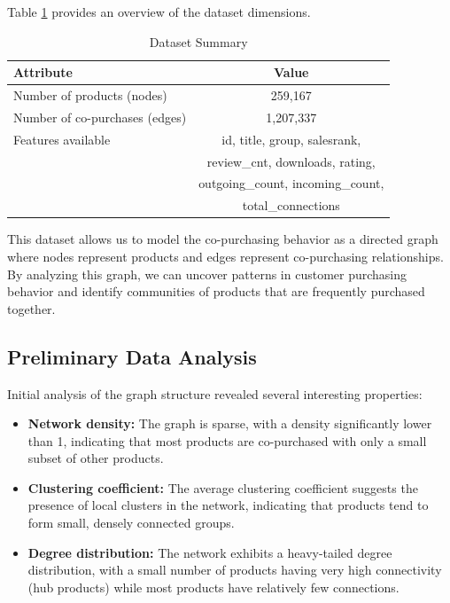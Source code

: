 \documentclass[conference]{IEEEtran}
\begin{document}
Table \ref{tab:data-summary} provides an overview of the dataset dimensions.

\begin{table}[ht]
\centering
\caption{Dataset Summary}
\label{tab:data-summary}
\begin{tabular}{lc}
\toprule
\textbf{Attribute} & \textbf{Value} \\
\midrule
Number of products (nodes) & 259,167 \\
Number of co-purchases (edges) & 1,207,337 \\
Features available & id, title, group, salesrank, \\
 & review\_cnt, downloads, rating, \\
 & outgoing\_count, incoming\_count, \\
 & total\_connections \\
\bottomrule
\end{tabular}
\end{table}

This dataset allows us to model the co-purchasing behavior as a directed graph where nodes represent products and edges represent co-purchasing relationships. By analyzing this graph, we can uncover patterns in customer purchasing behavior and identify communities of products that are frequently purchased together.

\subsection{Preliminary Data Analysis}
Initial analysis of the graph structure revealed several interesting properties:

\begin{itemize}
    \item \textbf{Network density:} The graph is sparse, with a density significantly lower than 1, indicating that most products are co-purchased with only a small subset of other products.
    
    \item \textbf{Clustering coefficient:} The average clustering coefficient suggests the presence of local clusters in the network, indicating that products tend to form small, densely connected groups.
    
    \item \textbf{Degree distribution:} The network exhibits a heavy-tailed degree distribution, with a small number of products having very high connectivity (hub products) while most products have relatively few connections.
\end{itemize}
\end{document}
